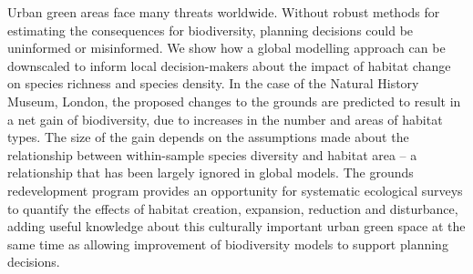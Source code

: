Urban green areas face many threats worldwide. Without robust methods for estimating the consequences for biodiversity, planning decisions could be uninformed or misinformed. We show how a global modelling approach can be downscaled to inform local decision-makers about the impact of habitat change on species richness and species density. In the case of the Natural History Museum, London, the proposed changes to the grounds are predicted to result in a net gain of biodiversity, due to increases in the number and areas of habitat types. The size of the gain depends on the assumptions made about the relationship between within-sample species diversity and habitat area -- a relationship that has been largely ignored in global models. The grounds redevelopment program provides an opportunity for systematic ecological surveys to quantify the effects of habitat creation, expansion, reduction and disturbance, adding useful knowledge about this culturally important urban green space at the same time as allowing improvement of biodiversity models to support planning decisions.

